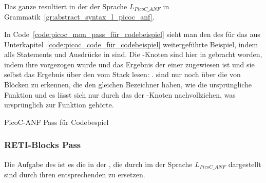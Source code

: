 Das ganze resultiert in der  der Sprache $L_{PicoC\_ANF}$ in Grammatik~\ref{gr:abstract_syntax_l_picoc_anf}.

\begin{grammar}
  \toprule
  \commentsecond*
  \midrule
  \arithanf
  \midrule
  \logicanf
  \midrule
  \assignanf
  \midrule
  \pntranf*
  \midrule
  \arrayanf*
  \midrule
  \struct*
  \midrule
  \ifelseanf*
  \midrule
  \funanf*
  \midrule
  \block*
  \midrule
  \fileanf*
  \midrule
  \symbolsecond
  \bottomrule
\end{grammar}


In Code~\ref{code:picoc_mon_pass_für_codebeispiel} sieht man den  des  für das aus Unterkapitel~\ref{code:picoc_code_für_codebeispiel} weitergeführte Beispiel, indem alls Statements und Ausdrücke in  sind. Die -Knoten sind hier in   gebracht worden, indem ihre  vorgezogen wurde und das Ergebnis der  einer  zugewiesen ist und sie selbst das Ergebnis über den   vom Stack lesen: .  sind nur noch über die  von Blöcken zu erkennen, die den gleichen Bezeichner haben, wie die ursprüngliche Funktion und es lässt sich nur durch das  der -Knoten nachvollziehen, was ursprünglich zur Funktion gehörte.

\begin{code}
  \centering
  \caption{PicoC-ANF Pass für Codebespiel}
  \label{code:picoc_mon_pass_für_codebeispiel}
\end{code}

\subsubsection{RETI-Blocks Pass}
\label{reti_blocks_pass}

\label{sec:reti_blocks_pass_zweck}

Die Aufgabe des  ist es die  in der , die durch  im  der Sprache $L_{PicoC\_ANF}$ dargestellt sind durch ihren entsprechenden  zu ersetzen.

